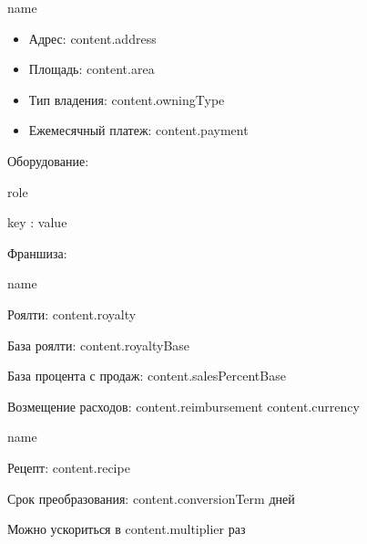 \documentclass[a4paper,12pt]{article}
\begin{document}
{{{{{{{{{{{{{{{%
  {%
    {{ name }}

    \begin{itemize}
    \item Адрес: {{ content.address }}
    \item Площадь: {{ content.area }}
    \item Тип владения: {{ content.owningType }}
    \item Ежемесячный платеж: {{ content.payment }}
    \end{itemize}
    {%
    Оборудование:
    {%
    {%
      {%
      {{ role }}
        {%
        {{ key }}: {{ value }}

        {%
      {%
    {%
  {%
{%

{%
Франшиза:
  {%
      {{ name }}

      Роялти: {{ content.royalty }}
      
      База роялти: {{ content.royaltyBase }}
      
      База процента с продаж: {{ content.salesPercentBase }}

      Возмещение расходов: {{ content.reimbursement }} {{ content.currency }}
  {%
{%

{%
  {%
      {{ name }}

      Рецепт: {{ content.recipe }}

      Срок преобразования: {{ content.conversionTerm }} дней
      
      Можно ускориться в {{ content.multiplier }} раз

}}}}}}}}}}}}}}}}}}}}}}}}}}}}}}}}
\end{document}
